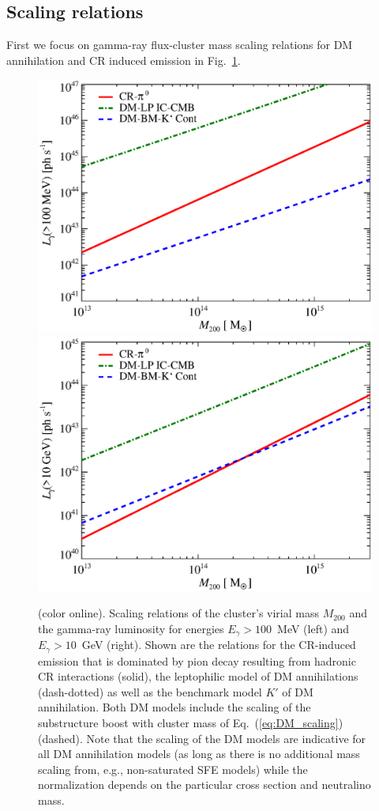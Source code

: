 \documentclass[10pt,aps,pra,reprint,amsmath,amsfonts,amssymb,showpacs,nofootinbib,floatfix]{revtex4-1}
\newcommand{\colo}{(color online). }
\newcommand{\mvir}{M_{200}}
\begin{document}
\subsection{Scaling relations}
First we focus on gamma-ray flux-cluster mass scaling relations for DM
annihilation and CR induced emission in
Fig.~\ref{fig:lum_mass_scaling}.
\begin{figure}
  \includegraphics[width=0.99\columnwidth]{figures/MLscaling.100M.eps}
  \includegraphics[width=0.99\columnwidth]{figures/MLscaling.10G.eps}
  \caption{\colo Scaling relations of the cluster's
    virial mass $\mvir$ and the gamma-ray luminosity for energies
    $E_\gamma>100$~MeV (left) and $E_\gamma>10$~GeV (right). Shown are
    the relations for the CR-induced emission that is dominated by
    pion decay resulting from hadronic CR interactions (solid), the
    leptophilic model of DM annihilations (dash-dotted) as well as the
    benchmark model $K'$ of DM annihilation. Both DM models include
    the scaling of the substructure boost with cluster mass of
    Eq.~(\ref{eq:DM_scaling}) (dashed). Note that the scaling of the
    DM models are indicative for all DM annihilation models (as long
    as there is no additional mass scaling from, e.g., non-saturated
    SFE models) while the normalization depends on the particular
    cross section and neutralino mass.}
\label{fig:lum_mass_scaling}
\end{figure}
\end{document}
